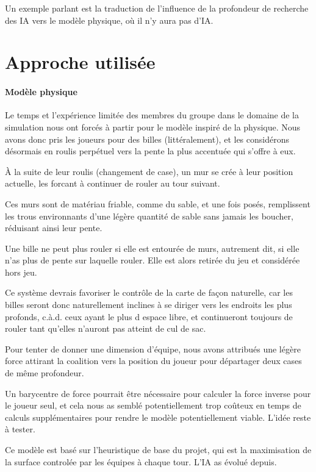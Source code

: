 		Un exemple parlant est la traduction de l'influence de la profondeur de recherche des IA vers le modèle physique, où il n'y aura pas d'IA.
	
	\section{Approche utilisée}
	
		\paragraph{Modèle physique}
		Le temps et l'expérience limitée des membres du groupe dans le domaine de la simulation nous ont forcés à partir pour le modèle inspiré de la physique.
		Nous avons donc pris les joueurs pour des billes (littéralement), et les considérons désormais en roulis perpétuel vers la pente la plus accentuée qui s'offre à eux.
		
		À la suite de leur roulis (changement de case), un mur se crée à leur position actuelle, les forcant à continuer de rouler au tour suivant.
		
		Ces murs sont de matériau friable, comme du sable, et une fois posés, remplissent les trous environnants d'une légère quantité de sable sans jamais les boucher, réduisant ainsi leur pente.
		
		Une bille ne peut plus rouler si elle est entourée de murs, autrement dit, si elle n'as plus de pente sur laquelle rouler.
		Elle est alors retirée du jeu et considérée hors jeu.
		
		Ce système devrais favoriser le contrôle de la carte de façon naturelle, car les billes seront donc naturellement inclines à se diriger vers les endroits les plus profonds, c.à.d. ceux ayant le plus d espace libre, et continueront toujours de rouler tant qu'elles n'auront pas atteint de cul de sac.
		
		Pour tenter de donner une dimension d'équipe, nous avons attribués une légère force attirant la coalition vers la position du joueur pour départager deux cases de même profondeur.
		
		Un barycentre de force pourrait être nécessaire pour calculer la force inverse pour le joueur seul, et cela nous as semblé potentiellement trop coûteux en temps de calculs supplémentaires pour rendre le modèle potentiellement viable.
		L'idée reste à tester.
		

		\begin{info}
			Ce modèle est basé sur l'heuristique de base du projet, qui est la maximisation de la surface controlée par les équipes à chaque tour. L'IA as évolué depuis.
		\end{info}
		
